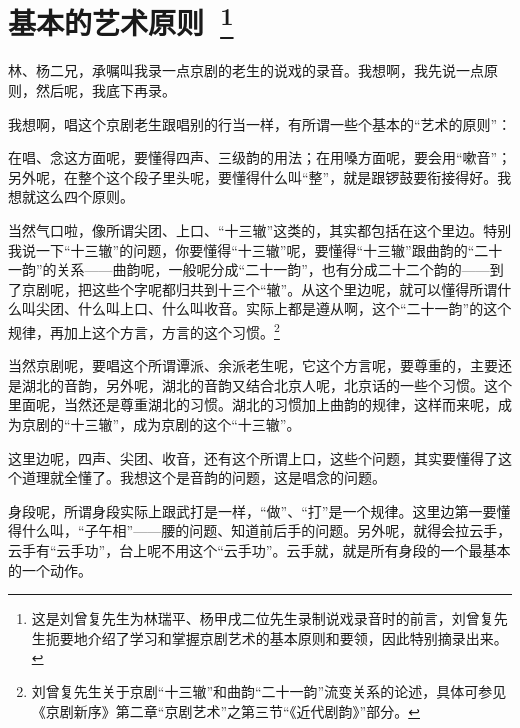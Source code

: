 \newpage
{} %
\pagestyle{fancy}    %

\section*{{\hei \large 基本的艺术原则}~\protect\footnote{这是刘曾复先生为林瑞平、杨甲戌二位先生录制说戏录音时的前言，刘曾复先生扼要地介绍了学习和掌握京剧艺术的基本原则和要领，因此特别摘录出来。%
}}%

\textrm{林、杨二兄，承嘱叫我录一点京剧的老生的说戏的录音。我想啊，我先说一点原则，然后呢，我底下再录。}

\textrm{我想啊，唱这个京剧老生跟唱别的行当一样，有所谓一些个基本的``艺术的原则''：}

\textrm{在唱、念这方面呢，要懂得四声、三级韵的用法；在用嗓方面呢，要会用``嗽音''；另外呢，在整个这个段子里头呢，要懂得什么叫``整''，就是跟锣鼓要衔接得好。我想就这么四个原则。}

\textrm{当然气口啦，像所谓尖团、上口、``十三辙''这类的，其实都包括在这个里边。特别我说一下``十三辙''的问题，你要懂得``十三辙''呢，要懂得``十三辙''跟曲韵的``二十一韵''的关系------曲韵呢，一般呢分成``二十一韵''，也有分成二十二个韵的------到了京剧呢，把这些个字呢都归共到十三个``辙''。从这个里边呢，就可以懂得所谓什么叫尖团、什么叫上口、什么叫收音。实际上都是遵从啊，这个``二十一韵''的这个规律，再加上这个方言，方言的这个习惯。}\footnote{刘曾复先生关于京剧``十三辙''和曲韵``二十一韵''流变关系的论述，具体可参见《京剧新序》第二章``京剧艺术''之第三节``《近代剧韵》''部分。%
}

\textrm{当然京剧呢，要唱这个所谓谭派、余派老生呢，它这个方言呢，要尊重的，主要还是湖北的音韵，另外呢，湖北的音韵又结合北京人呢，北京话的一些个习惯。这个里面呢，当然还是尊重湖北的习惯。湖北的习惯加上曲韵的规律，这样而来呢，成为京剧的``十三辙''，成为京剧的这个``十三辙''。}

\textrm{这里边呢，四声、尖团、收音，还有这个所谓上口，这些个问题，其实要懂得了这个道理就全懂了。我想这个是音韵的问题，这是唱念的问题。}

\textrm{身段呢，所谓身段实际上跟武打是一样，``做''、``打''是一个规律。这里边第一要懂得什么叫，``子午相''------腰的问题、知道前后手的问题。另外呢，就得会拉云手，云手有``云手功''，台上呢不用这个``云手功''。云手就，就是所有身段的一个最基本的一个动作。}

